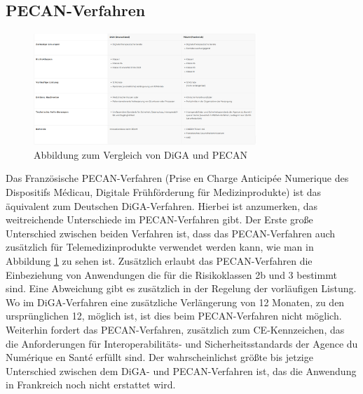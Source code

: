 \documentclass{article}
\begin{document}
		\subsection{PECAN-Verfahren}
			\begin{figure}[htbp]
				\centering
				\includegraphics[width=0.75\textwidth]{./grafiken/abbildung-diga-versus-pecan}
				\caption[DiGA vs. PECAN]{Abbildung zum Vergleich von DiGA und PECAN}
				\label{Abb-diga-vs-pecan}
			\end{figure}
			Das Französische PECAN-Verfahren (Prise en Charge Anticipée Numerique des Dispositifs Médicau, Digitale Frühförderung für Medizinprodukte) ist das äquivalent zum Deutschen DiGA-Verfahren. Hierbei ist anzumerken, das weitreichende Unterschiede im PECAN-Verfahren gibt. Der Erste große Unterschied zwischen beiden Verfahren ist, dass das PECAN-Verfahren auch zusätzlich für Telemedizinprodukte verwendet werden kann, wie man in Abbildung \ref{Abb-diga-vs-pecan} zu sehen ist. Zusätzlich erlaubt das PECAN-Verfahren die Einbeziehung von Anwendungen die für die Risikoklassen 2b und 3 bestimmt sind. Eine Abweichung gibt es zusätzlich in der Regelung der vorläufigen Listung. Wo im DiGA-Verfahren eine zusätzliche Verlängerung von 12 Monaten, zu den ursprünglichen 12, möglich ist, ist dies beim PECAN-Verfahren nicht möglich. Weiterhin fordert das PECAN-Verfahren, zusätzlich zum CE-Kennzeichen, das die Anforderungen für Interoperabilitäts- und Sicherheitsstandards der Agence du Numérique en Santé erfüllt sind. Der wahrscheinlichst größte bis jetzige Unterschied zwischen dem DiGA- und PECAN-Verfahren ist, das die Anwendung in Frankreich noch nicht erstattet wird.\cite{PECAN-Verfahren}
\end{document}
